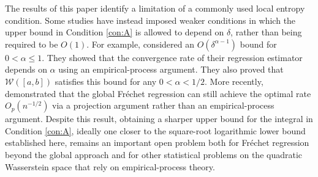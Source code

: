 \documentclass[11pt]{article}
\numberwithin{equation}{section}
\newcommand{\W}{\mathcal{W}}
\begin{document}
The results of this paper identify a limitation of a commonly used
local entropy condition. Some studies have instead imposed weaker conditions in which the upper bound in Condition \ref{con:A} is allowed to depend on \(\delta\), rather than being required to be \(O(1)\). For example, \citet{ImJeonPark2025} considered an $O(\delta^{\alpha-1})$ bound for $0<\alpha\leq 1$. They showed that the convergence rate of their regression estimator depends on $\alpha$ using an empirical-process argument. They also proved that \(\W([a,b])\) satisfies this bound for any \(0 < \alpha < 1/2\). More recently, \citet{PetersenMuller2026} demonstrated that the global Fr\'echet regression can still achieve the optimal rate $O_p(n^{-1/2})$ via a projection argument rather than an empirical-process argument. 
Despite this result, obtaining a sharper upper bound for the integral in Condition \ref{con:A}, ideally one closer to the square-root logarithmic lower bound established here, remains an important open problem both for Fr\'echet regression beyond the global approach and for other statistical problems on the quadratic Wasserstein space that rely on empirical-process theory.

%


\end{document}
